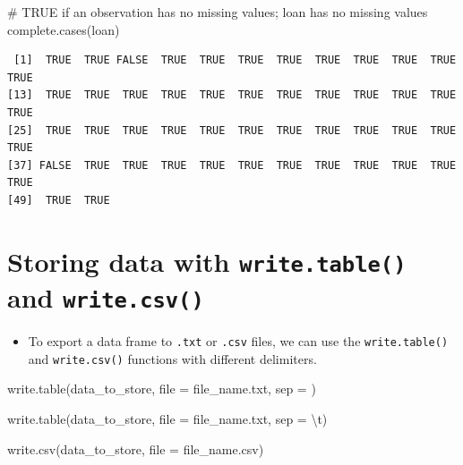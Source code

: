 \documentclass[
  letterpaper,
  DIV=11,
  numbers=noendperiod]{scrreprt}
\newenvironment{Shaded}{\begin{snugshade}}{\end{snugshade}}
\newcommand{\AttributeTok}[1]{\textcolor[rgb]{0.40,0.45,0.13}{#1}}
\newcommand{\CommentTok}[1]{\textcolor[rgb]{0.37,0.37,0.37}{#1}}
\newcommand{\FunctionTok}[1]{\textcolor[rgb]{0.28,0.35,0.67}{#1}}
\newcommand{\NormalTok}[1]{\textcolor[rgb]{0.00,0.23,0.31}{#1}}
\newcommand{\SpecialCharTok}[1]{\textcolor[rgb]{0.37,0.37,0.37}{#1}}
\newcommand{\StringTok}[1]{\textcolor[rgb]{0.13,0.47,0.30}{#1}}
\providecommand{\tightlist}{%
  \setlength{\itemsep}{0pt}\setlength{\parskip}{0pt}}\usepackage{longtable,booktabs,array}
\begin{document}
\begin{tcolorbox}
\begin{verbatim}
\end{verbatim}

\begin{Shaded}
\begin{Highlighting}[]
\CommentTok{\# TRUE if an observation has no missing values; loan has no missing values}
\FunctionTok{complete.cases}\NormalTok{(loan)}
\end{Highlighting}
\end{Shaded}

\begin{verbatim}
 [1]  TRUE  TRUE FALSE  TRUE  TRUE  TRUE  TRUE  TRUE  TRUE  TRUE  TRUE  TRUE
[13]  TRUE  TRUE  TRUE  TRUE  TRUE  TRUE  TRUE  TRUE  TRUE  TRUE  TRUE  TRUE
[25]  TRUE  TRUE  TRUE  TRUE  TRUE  TRUE  TRUE  TRUE  TRUE  TRUE  TRUE  TRUE
[37] FALSE  TRUE  TRUE  TRUE  TRUE  TRUE  TRUE  TRUE  TRUE  TRUE  TRUE  TRUE
[49]  TRUE  TRUE
\end{verbatim}

\end{tcolorbox}

\section{\texorpdfstring{Storing data with \texttt{write.table()} and
\texttt{write.csv()}}{Storing data with write.table() and write.csv()}}\label{storing-data-with-write.table-and-write.csv}

\begin{itemize}
\tightlist
\item
  To export a data frame to \texttt{.txt} or \texttt{.csv} files, we can
  use the \texttt{write.table()} and \texttt{write.csv()} functions with
  different delimiters.
\end{itemize}

\begin{Shaded}
\begin{Highlighting}[]
\FunctionTok{write.table}\NormalTok{(data\_to\_store, }\AttributeTok{file =} \StringTok{\textquotesingle{}file\_name.txt\textquotesingle{}}\NormalTok{, }\AttributeTok{sep =} \StringTok{\textquotesingle{}\textquotesingle{}}\NormalTok{)}

\FunctionTok{write.table}\NormalTok{(data\_to\_store, }\AttributeTok{file =} \StringTok{\textquotesingle{}file\_name.txt\textquotesingle{}}\NormalTok{, }\AttributeTok{sep =} \StringTok{\textquotesingle{}}\SpecialCharTok{\textbackslash{}t}\StringTok{\textquotesingle{}}\NormalTok{)}

\FunctionTok{write.csv}\NormalTok{(data\_to\_store, }\AttributeTok{file =} \StringTok{\textquotesingle{}file\_name.csv\textquotesingle{}}\NormalTok{)}
\end{Highlighting}
\end{Shaded}
\end{document}

